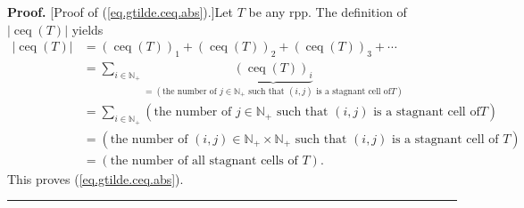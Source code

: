 \documentclass[numbers=enddot,12pt,final,onecolumn,notitlepage]{scrartcl}%
\theoremstyle{definition}
\newenvironment{proof}[1][Proof]{\noindent\textbf{#1.} }{\ \rule{0.5em}{0.5em}}
\newenvironment{verlong}{}{}
\let\sumnonlimits\sum
\renewcommand{\sum}{\sumnonlimits\limits}
\begin{document}
\begin{verlong}
\begin{proof}
[Proof of (\ref{eq.gtilde.ceq.abs}).]Let $T$ be any rpp. The definition of
$\left\vert \operatorname*{ceq}\left(  T\right)  \right\vert $ yields%
\begin{align*}
\left\vert \operatorname*{ceq}\left(  T\right)  \right\vert  &  =\left(
\operatorname*{ceq}\left(  T\right)  \right)  _{1}+\left(  \operatorname*{ceq}%
\left(  T\right)  \right)  _{2}+\left(  \operatorname*{ceq}\left(  T\right)
\right)  _{3}+\cdots\\
&  =\sum_{i\in\mathbb{N}_{+}}\underbrace{\left(  \operatorname*{ceq}\left(
T\right)  \right)  _{i}}_{=\left(  \text{the number of }j\in\mathbb{N}%
_{+}\text{ such that }\left(  i,j\right)  \text{ is a stagnant cell of
}T\right)  }\\
&  =\sum_{i\in\mathbb{N}_{+}}\left(  \text{the number of }j\in\mathbb{N}%
_{+}\text{ such that }\left(  i,j\right)  \text{ is a stagnant cell of
}T\right) \\
&  =\left(  \text{the number of }\left(  i,j\right)  \in\mathbb{N}_{+}%
\times\mathbb{N}_{+}\text{ such that }\left(  i,j\right)  \text{ is a stagnant
cell of }T\right) \\
&  =\left(  \text{the number of all stagnant cells of }T\right)  .
\end{align*}
This proves (\ref{eq.gtilde.ceq.abs}).
\end{proof}
\end{verlong}
\end{document}
